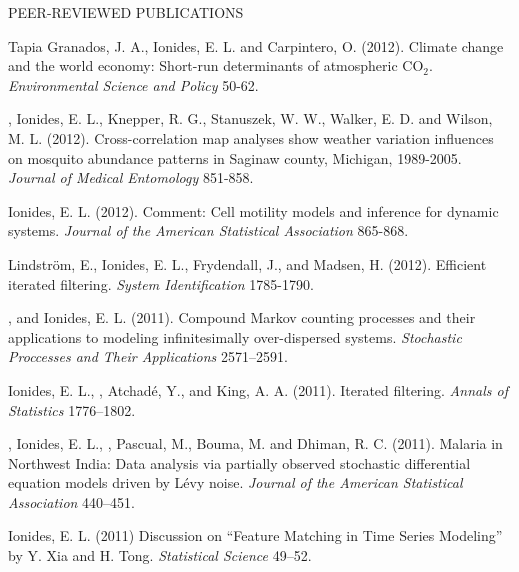 \begin{reflist}{PEER-REVIEWED PUBLICATIONS}
\item\formal{[[\tapiaESP] ] }
Tapia Granados, J. A., Ionides, E. L.  and Carpintero, O. (2012). Climate change and the world economy: Short-run determinants of atmospheric $\mathrm{CO}_2$. {\em Environmental Science and Policy} {}{\separator}50-62.

\item\formal{[[\chuangJME] ] }
, Ionides, E. L., Knepper, R. G., Stanuszek, W. W., Walker, E. D. and Wilson, M. L. (2012).
Cross-correlation map analyses show weather variation influences on mosquito abundance patterns in Saginaw county, Michigan, 1989-2005. {\em Journal of Medical Entomology} {}{\separator}851-858.

\item\formal{[[\ionidesJASA] ]}
Ionides, E. L. (2012). Comment: Cell motility models and inference for dynamic systems. {\em Journal of the American Statistical Association} {}{\separator}865-868.

\item\formal{[[\lindstromIFAC] ]} 
Lindstr\"{o}m, E., Ionides, E. L., Frydendall, J., and Madsen, H. (2012). Efficient iterated filtering. 
{\em System Identification} {}{\separator}1785-1790.

\item\formal{[[\bretoSPA] ]}
 , and Ionides, E. L. (2011). Compound Markov counting processes and their applications to modeling infinitesimally over-dispersed systems. {\em Stochastic Proccesses and Their Applications} {}{\separator}2571--2591.

\item\formal{[[\ionidesAOS] ]}
 Ionides, E. L., , Atchad\'{e}, Y., and King, A. A. (2011). Iterated filtering. {\em Annals of Statistics} {}{\separator}1776--1802.

\item\formal{[[\bhadraJASA] ]} , Ionides, E. L., , Pascual, M., Bouma, M. and Dhiman, R. C. (2011).
Malaria in Northwest India: Data analysis via partially observed stochastic differential equation models driven by L\'{e}vy noise. {\em Journal of the American Statistical Association} {}{\separator}440--451.

\item\formal{[[\ionidesSTATSCI] ]} Ionides, E. L. (2011) Discussion on ``Feature Matching in Time Series Modeling'' by Y. Xia and H. Tong.  {\em Statistical Science} {}{\separator}49--52.


\end{reflist}

